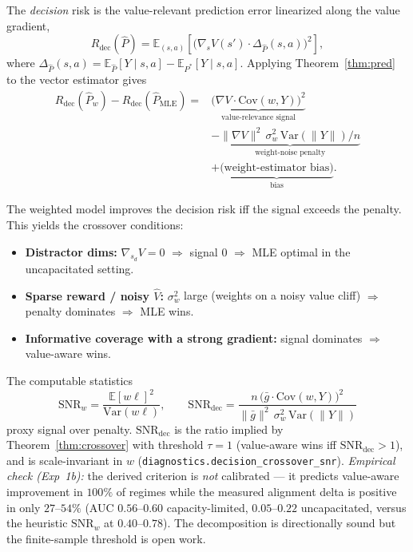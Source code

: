 \documentclass{article}
\theoremstyle{plain}
\begin{document}
\begin{theorem}
\label{thm:crossover}
The \emph{decision} risk is the value-relevant prediction error linearized along the
value gradient,
\begin{equation}
  R_{\mathrm{dec}}(\hat{P})
    = \mathbb{E}_{(s,a)}\!\left[
      \bigl( \nabla_s V(s') \cdot \Delta_{\hat{P}}(s,a) \bigr)^2
    \right],
\end{equation}
where $\Delta_{\hat{P}}(s,a) = \mathbb{E}_{\hat{P}}[Y \mid s,a] - \mathbb{E}_{P^*}[Y \mid s,a]$.
Applying Theorem~\ref{thm:pred} to the vector estimator gives
\begin{equation}
\begin{aligned}
  R_{\mathrm{dec}}(\hat{P}_w) - R_{\mathrm{dec}}(\hat{P}_{\mathrm{MLE}})
  ={}& \underbrace{\bigl(\nabla V \cdot \mathrm{Cov}(w, Y)\bigr)^2}
        _{\text{value-relevance signal}} \\
      &- \underbrace{\lVert \nabla V\rVert^2\, \sigma_w^2\,
        \mathrm{Var}(\lVert Y\rVert)/n}_{\text{weight-noise penalty}} \\
      &+ \underbrace{\text{(weight-estimator bias)}}_{\text{bias}}.
\end{aligned}
\end{equation}
\end{theorem}

The weighted model improves the decision risk iff the signal exceeds the penalty. This
yields the crossover conditions:
\begin{itemize}
\item \textbf{Distractor dims:} $\nabla_{s_d} V = 0$ $\Rightarrow$ signal $0$
  $\Rightarrow$ MLE optimal in the uncapacitated setting.
\item \textbf{Sparse reward / noisy $\hat{V}$:} $\sigma_w^2$ large (weights on a noisy
  value cliff) $\Rightarrow$ penalty dominates $\Rightarrow$ MLE wins.
\item \textbf{Informative coverage with a strong gradient:} signal dominates
  $\Rightarrow$ value-aware wins.
\end{itemize}

The computable statistics
\begin{equation}
  \mathrm{SNR}_w = \frac{\mathbb{E}[w\ell]^2}{\mathrm{Var}(w\ell)},
  \qquad
  \mathrm{SNR}_{\mathrm{dec}} = \frac{n\,\bigl(\bar g \cdot \mathrm{Cov}(w, Y)\bigr)^2}
    {\lVert \bar g\rVert^2\, \sigma_w^2\, \mathrm{Var}(\lVert Y\rVert)}
\end{equation}
proxy signal over penalty. $\mathrm{SNR}_{\mathrm{dec}}$ is the ratio implied by
Theorem~\ref{thm:crossover} with threshold $\tau = 1$ (value-aware wins iff
$\mathrm{SNR}_{\mathrm{dec}} > 1$), and is scale-invariant in $w$
(\texttt{diagnostics.decision\_crossover\_snr}). \emph{Empirical check (Exp~1b):} the
derived criterion is \emph{not} calibrated --- it predicts value-aware improvement in
$100\%$ of regimes while the measured alignment delta is positive in only $27$--$54\%$
(AUC $0.56$--$0.60$ capacity-limited, $0.05$--$0.22$ uncapacitated, versus the heuristic
$\mathrm{SNR}_w$ at $0.40$--$0.78$). The decomposition is directionally sound but the
finite-sample threshold is open work.
\end{document}
